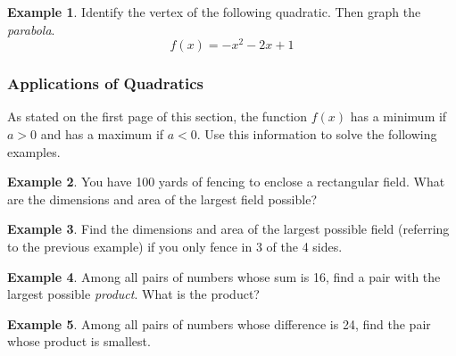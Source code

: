 \documentclass[addpoints,12pt]{exam}
\theoremstyle{definition}
\theoremstyle{break}
\theoremstyle{break}
\newtheorem{example}{Example}[subsection]
\begin{document}
\newpage

\begin{example}
Identify the vertex of the following quadratic. Then graph the \emph{parabola}.
\[f(x) = -x^2 - 2x + 1\]
\vfill

\begin{figure}[h]
\centering
{}
\end{figure}
\end{example}

\newpage

\subsubsection*{Applications of Quadratics}

As stated on the first page of this section, the function $f(x)$ has a minimum if $a > 0$ and has a maximum if $a < 0$. Use this information to solve the following examples.
\vspace{.15in}

\begin{example}
You have 100 yards of fencing to enclose a rectangular field. What are the dimensions and area of the largest field possible?
\vspace{2.75in}
\end{example}

\begin{example}
Find the dimensions and area of the largest possible field (referring to the previous example) if you only fence in 3 of the 4 sides.
\end{example}

\newpage

\begin{example}
Among all pairs of numbers whose sum is 16, find a pair with the largest possible \emph{product}. What is the product?
\vspace{3in}
\end{example}

\begin{example}
Among all pairs of numbers whose difference is 24, find the pair whose product is smallest.
\end{example}
\end{document}

